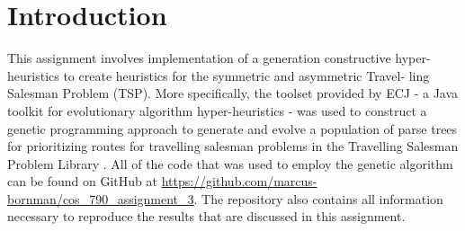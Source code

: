 \section{Introduction}
This assignment involves implementation of a generation constructive hyper-
heuristics to create heuristics for the symmetric and asymmetric Travel-
ling Salesman Problem (TSP). More specifically, the toolset provided by ECJ \cite{pillay2017evohyp} - a Java toolkit for evolutionary algorithm hyper-heuristics - was used to construct a genetic programming approach to generate and evolve a population of parse trees for prioritizing routes for travelling salesman problems in the Travelling Salesman Problem Library \cite{reinelt1991tsplib}. All of the code that was used to employ the genetic algorithm can be found on GitHub at \url{https://github.com/marcus-bornman/cos_790_assignment_3}. The repository also contains all information necessary to reproduce the results that are discussed in this assignment.
